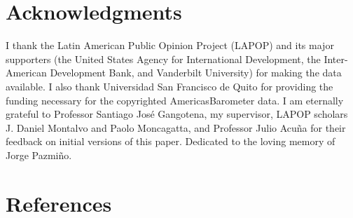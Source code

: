 \documentclass[12pt,a4]{article}\usepackage[]{graphicx}\usepackage[]{xcolor}
\begin{document}



\section*{Acknowledgments}

I thank the Latin American Public Opinion Project (LAPOP) and its major supporters (the
United States Agency for International Development, the Inter-American Development Bank, and
Vanderbilt University) for making the data available. I also thank Universidad San Francisco de Quito for providing
the funding necessary for the copyrighted AmericasBarometer data. I am eternally grateful to Professor Santiago José Gangotena, my supervisor, LAPOP scholars J. Daniel Montalvo and Paolo Moncagatta, and Professor Julio Acuña for their feedback on initial versions of this paper. Dedicated to the loving memory of Jorge Pazmiño.



\section{References}

\printbibliography[heading = none]
\end{document}
